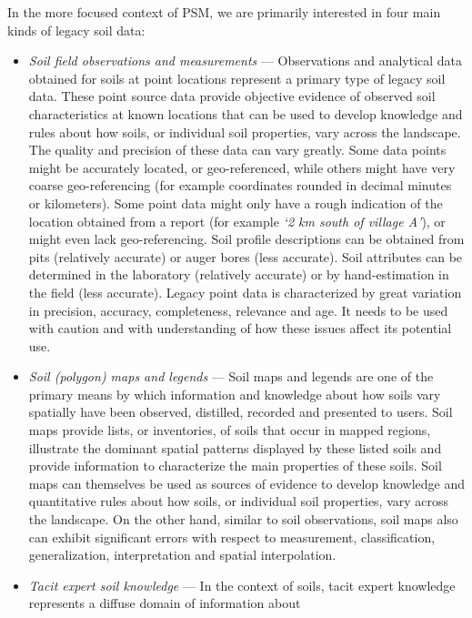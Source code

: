 \documentclass[graybox,natbib,nospthms,UStrade]{svmono}
\begin{document}
In the more focused context of PSM, we are primarily interested in
four main kinds of legacy soil data:

\begin{itemize}
\item
  \emph{Soil field observations and measurements} --- Observations and
  analytical data obtained for soils at point locations represent a
  primary type of legacy soil data. These point source data provide
  objective evidence of observed soil characteristics at known
  locations that can be used to develop knowledge and rules about how
  soils, or individual soil properties, vary across the landscape. The
  quality and precision of these data can vary greatly. Some data
  points might be accurately located, or geo-referenced, while others
  might have very coarse geo-referencing (for example coordinates
  rounded in decimal minutes or kilometers). Some point data might
  only have a rough indication of the location obtained from a report
  (for example \emph{`2 km south of village A'}), or might even
  lack geo-referencing. Soil profile descriptions can be obtained from
  pits (relatively accurate) or auger bores (less accurate). Soil
  attributes can be determined in the laboratory (relatively accurate)
  or by hand-estimation in the field (less accurate). Legacy point
  data is characterized by great variation in precision, accuracy,
  completeness, relevance and age. It needs to be used with caution
  and with understanding of how these issues affect its potential use.
\item
  \emph{Soil (polygon) maps and legends} --- Soil maps and legends are one of
  the primary means by which information and knowledge about how soils
  vary spatially have been observed, distilled, recorded and presented
  to users. Soil maps provide lists, or inventories, of soils that
  occur in mapped regions, illustrate the dominant spatial patterns
  displayed by these listed soils and provide information to
  characterize the main properties of these soils. Soil maps can themselves
  be used as sources of evidence to develop knowledge and quantitative rules about how soils,
  or individual soil properties, vary across the landscape. On the
  other hand, similar to soil observations, soil maps also can exhibit
  significant errors with respect to measurement, classification,
  generalization, interpretation and spatial interpolation.
\item
  \emph{Tacit expert soil knowledge} --- In the context of soils, tacit
  expert knowledge represents a diffuse domain of information about

\end{itemize}
\end{document}

